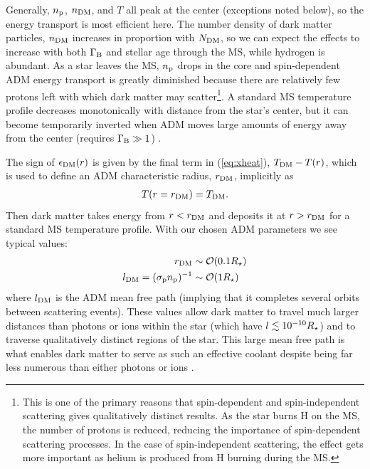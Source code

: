 \documentclass[useAMS,usenatbib]{mnras}
\begin{document}
  Generally, $n_{\mathrm{p}}$, $n_{\mathrm{DM}}$, and $T$ all peak at the center (exceptions noted below), so the energy transport is most efficient here. The number density 
  of dark matter particles, $n_{\mathrm{DM}}$ increases in proportion with $N_{\mathrm{DM}}$, so we can expect the effects to increase with both $\Gamma_\mathrm{B}$ and stellar age through the MS, while hydrogen is abundant. As a star leaves the MS, $n_{\mathrm{p}}$ drops in the core and spin-dependent ADM energy transport is greatly diminished because there are relatively few protons left with which dark matter may scatter\footnote{This is one of the primary reasons that spin-dependent and spin-independent scattering gives qualitatively distinct results. As the star burns H on the MS, the number of protons is reduced, reducing the importance of spin-dependent scattering processes. In the case of spin-independent scattering, the effect gets more important as helium 
  is produced from H burning during the MS.}. A standard MS temperature profile decreases monotonically with distance from the star's center, but it can become temporarily inverted when ADM moves large amounts of energy away from the center (requires $\Gamma_\mathrm{B} \gg 1$) . 

  The sign of $\epsilon_{\mathrm{DM}}(r)$ is given by the final term in (\ref{eq:xheat}), $T_{\mathrm{DM}} - T(r)$, which is used to define an ADM characteristic radius, $r_{\mathrm{DM}}$, implicitly as
  \begin{align}
    T(r=r_{\mathrm{DM}}) = T_{\mathrm{DM}}.
  \end{align}
  Then dark matter takes energy from $r < r_{\mathrm{DM}}$ and deposits it at $r > r_{\mathrm{DM}}$ for a standard MS temperature profile. With our chosen ADM parameters we see typical values:
  \begin{align}
    r_{\mathrm{DM}} & \sim \mathcal{O}(0.1 R_{\star}) \\
    l_{\mathrm{DM}} = (\sigma_{\mathrm{p}} n_{\mathrm{p}})^{-1} & \sim\mathcal{O}(1 R_{\star})
  \end{align}
  where $l_{\mathrm{DM}}$ is the ADM mean free path (implying that it completes several orbits between scattering events). These values allow dark matter to travel much larger distances than photons or ions within the star (which have $l \lesssim 10^{-10} R_{\star}$) and to traverse qualitatively distinct 
  regions of the star. This large mean free path is what enables dark matter 
  to serve as such an effective coolant despite being far less numerous than either photons or ions \citep{Press1985EffectInterior}.  
\end{document}
